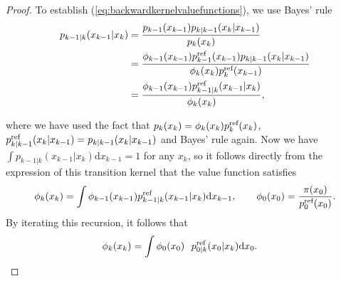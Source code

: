 \documentclass{article} %
\begin{document}
\begin{proof}
To establish (\ref{eq:backwardkernelvaluefunctions}), we use Bayes' rule
\begin{align*}
    p_{k-1|k}(x_{k-1}|x_{k})&=\frac{p_{k-1}(x_{k-1})p_{k|k-1}(x_{k}|x_{k-1})}{p_{k}(x_{k})}\\
    &=\frac{\phi_{k-1}(x_{k-1})p^{\textup{ref}}_{k-1}(x_{k-1})p_{k|k-1}(x_{k}|x_{k-1})}{\phi_{k}(x_{k})p^{\textup{ref}}_{k}(x_{k-1})}\\
    &=\frac{\phi_{k-1}(x_{k-1})p^{\textup{ref}}_{k-1|k}(x_{k-1}|x_{k})}{\phi_{k}(x_{k})},
\end{align*}

where we have used the fact that $p_k(x_k)=\phi_k(x_k)p^{\textup{ref}}_{k}(x_{k})$, $p^{\textup{ref}}_{k|k-1}(x_{k}|x_{k-1})=p_{k|k-1}(x_{k}|x_{k-1})$ and Bayes' rule again.
Now we have $\int p_{k-1|k}(x_{k-1}|x_{k}) \mathrm{d}x_{k-1}=1$ for any $x_k$, so it follows directly from the expression of this transition kernel that the value function satisfies
 \begin{align}\label{eq:valuefunctionBellman2}
    \phi_k(x_k)=\int \phi_{k-1}(x_{k-1})p^{\textup{ref}}_{k-1|k}(x_{k-1}|x_{k})\mathrm{d}x_{k-1},\qquad \phi_0(x_0)=\frac{\pi(x_0)}{p^{\textup{ref}}_0(x_0)}.
\end{align}
By iterating this recursion, it follows that
\begin{align}\label{eq:recursionvaluefunction2}
    \phi_k(x_k)&= \int \phi_0(x_0)~~p^{\textup{ref}}_{0|k}(x_{0}|x_{k})\mathrm{d}x_{0}.
\end{align}
\end{proof}
\end{document}
